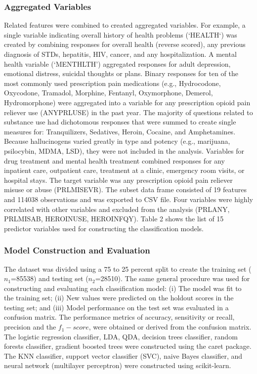 \documentclass[sigconf]{acmart}
\begin{document}
\subsubsection{Aggregated Variables}

Related features were combined to created aggregated variables. For example, 
a single variable indicating overall history of health problems (`HEALTH`) 
was created by combining responses for overall health (reverse scored), any
previous diagnosis of STDs, hepatitis, HIV, cancer, and any hospitalization. 
A mental health variable (`MENTHLTH') aggregated responses for adult depression, 
emotional distress, suicidal thoughts or plans. Binary responses for ten of 
the most commonly used prescription pain medications (e.g., Hydrocodone, 
Oxycodone, Tramadol, Morphine, Fentanyl, Oxymorphone, Demerol, Hydromorphone) 
were aggregated into a variable for any prescription opioid pain reliever use 
(ANYPRLUSE) in the past year. The majority of questions related to substance 
use had dichotomous responses that were summed to create single measures for: 
Tranquilizers, Sedatives, Heroin, Cocaine, and Amphetamines. Because 
hallucinogens varied greatly in type and potency (e.g., marijuana, psilocybin, 
MDMA, LSD), they were not included in the analysis. Variables for drug 
treatment and mental health treatment combined responses for any inpatient 
care, outpatient care, treatment at a clinic, emergency room visits, or 
hospital stays. The target variable was any prescription opioid pain reliever 
misuse or abuse (PRLMISEVR). The subset data frame consisted of 19 features 
and 114038 observations and was exported to CSV file. Four variables were highly 
correlated with other variables and excluded from the analysis (PRLANY, PRLMISAB, 
HEROINUSE, HEROINFQY). Table 2 shows the list of 15 predictor variables used for 
constructing the classification models. 


\subsubsection{Model Construction and Evaluation}

The dataset was divided using a 75 to 25 percent split to create the training 
set ($n_1$=85538) and testing set ($n_2$=28510). The same general procedure 
was used for constructing and evaluating each classification model: (i) The 
model was fit to the training set; (ii) New values were predicted on the 
holdout scores in the testing set; and (iii) Model performance on the test 
set was evaluated in a confusion matrix. The performance metrics of accuracy, 
sensitivity or recall, precision and the $f_1-score$, were obtained or 
derived from the confusion matrix. The logistic regression classifier, LDA, 
QDA, decision trees classifier, random forests classifier, gradient boosted 
trees were constructed using the caret package. The KNN classifier, support 
vector classifier (SVC), naive Bayes classifier, and neural network 
(multilayer perceptron) were constructed using scikit-learn. 
\end{document}
